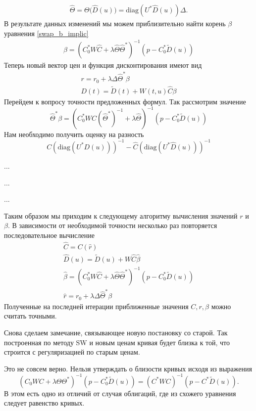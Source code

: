 \documentclass[10pt]{article}
\theoremstyle{definition}
\theoremstyle{remark}
\theoremstyle{plain}
\newcommand{\wt}{\widetilde}
\newcommand{\diag}{\mathrm{diag}}
\begin{document}
\begin{align}
\widehat{\Theta} =\Theta\bigl(\widehat{D}(u)\bigr) =  
\diag\left(U^*\widehat{D}(u)\right)\Delta. \label{tld_Tht_def}
\end{align}
В результате данных изменений мы можем приблизительно найти корень $\beta$ уравнения \eqref{swap_b_implic} 
\begin{align*}
\beta = 
\left(
	C_0^*W\widehat{C} + 
	\lambda \widehat{\Theta}\widehat{\Theta}^*
\right)^{-1}
\left(p-C_0^*\wt{D}(u)\right)
\end{align*}
Теперь новый вектор цен и функция дисконтирования имеют вид
\begin{gather}
r = r_0+\lambda\Delta\widehat{\Theta}^* \beta\\
D(t) = \wt{D}(t) + W(t,u)\widehat{C}\beta
\end{gather}
Перейдем к вопросу точности предложенных формул.
Так рассмотрим значение 
$$
\widehat{\Theta}^*\beta = 
\left(
	C_0^*W\widehat{C}(\widehat{\Theta}^{*})^{-1} + 
	\lambda \widehat{\Theta}
\right)^{-1}
\left(p-C_0^*\wt{D}(u)\right)
$$
Нам необходимо получить оценку на разность 
$$
C\left(\diag\left(U^*D(u)\right)\right)^{-1} - \widehat{C}\left(\diag\left(U^*\widehat{D}(u)\right)\right)^{-1}
$$

...

...

...

Таким образом мы приходим к следующему алгоритму вычисления значений $r$ и $\beta$. В зависимости от необходимой точности несколько раз повторяется последовательное вычисление
\begin{gather*}
\widehat{C} = C(\hat{r})
\\
\widehat{D}(u) = \wt{D}(u) + W\widehat{C}\hat{\beta}
\\
\hat{\beta} = 
\left(
	C_0^*W\widehat{C} + 
	\lambda \widehat{\Theta}\widehat{\Theta}^*
\right)^{-1}
\left(p-C_0^*\wt{D}(u)\right)
\\
\hat{r} = r_0+\lambda\Delta\widehat{\Theta}^* \beta
\end{gather*}
Полученные на последней итерации приближенные значения $C,r,\beta$ можно считать точными. 

Снова сделаем замечание, связывающее новую постановку со старой. Так построенная по методу SW и новым ценам кривая будет близка к той, что строится с регуляризацией по старым ценам.

Это не совсем верно. Нельзя утверждать о близости кривых исходя из выражения
$$
(C_0WC+\lambda\Theta\Theta^*)^{-1}(p-C_0^*\wt{D}(u)) = (C^*WC)^{-1}(p-C^*\wt{D}(u)).
$$
В этом есть одно из отличий от случая облигаций, где из схожего уравнения следует равенство кривых.
\end{document}
